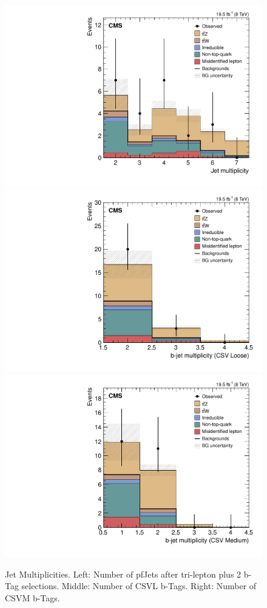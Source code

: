 \begin{figure}[h]
\begin{center}
\includegraphics[width=0.48\linewidth]{Figs/Plots_PreSelections/hNJets_3L2b.pdf}
\includegraphics[width=0.48\linewidth]{Figs/Plots_PreSelections/hNLoose_3L2b.pdf}
\includegraphics[width=0.48\linewidth]{Figs/Plots_PreSelections/hNMedium_3L2b.pdf}
\caption{\label{fig:jetmult_3L2b}
Jet Multiplicities. Left: Number of pfJets after tri-lepton plus 2 b-Tag selections. Middle: Number of CSVL b-Tags. Right: Number of CSVM b-Tags.
}
\end{center}
\end{figure}

